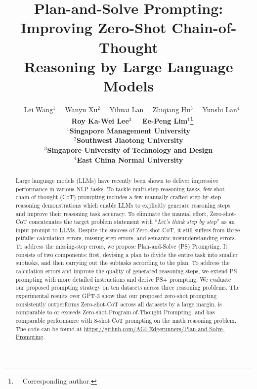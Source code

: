 \documentclass[11pt]{article}
\title{Plan-and-Solve Prompting: Improving Zero-Shot Chain-of-Thought \\ Reasoning by Large Language Models
}
\author{
    ~~Lei Wang$^{1}$
   ~~Wanyu Xu$^{2}$
   ~~Yihuai Lan 
   ~~Zhiqiang Hu$^{3}$ 
   ~~Yunshi Lan$^{4}$ \\ \bf
   ~~Roy Ka-Wei Lee$^{3}$
   ~~Ee-Peng Lim$^{1}$\thanks{~~Corresponding author.}\\ 
   $^{1}$Singapore Management University \\
   $^{2}$Southwest Jiaotong University \\
   $^{3}$Singapore University of Technology and Design\\
   $^{4}$East China Normal University\\
}
\begin{document}
\maketitle


\begin{abstract}
Large language models (LLMs) have recently been shown to deliver impressive performance in various NLP tasks. 
To tackle multi-step reasoning tasks, few-shot chain-of-thought (CoT) prompting 
includes a few manually crafted step-by-step reasoning demonstrations which 
enable LLMs to explicitly generate reasoning steps and improve their reasoning task accuracy. 
To eliminate the manual effort, Zero-shot-CoT concatenates the target problem statement with ``\textit{Let's think step by step}'' as an input prompt to LLMs.
Despite the success of Zero-shot-CoT, it still suffers from three pitfalls: calculation errors,  missing-step errors, and semantic misunderstanding errors.
To address the missing-step errors, we propose Plan-and-Solve (PS) Prompting.
It consists of two components: first, devising a plan to divide the entire task into smaller subtasks, and then carrying out the subtasks according to the plan.
To address the calculation errors and improve the quality of generated reasoning steps, we extend PS prompting with more detailed instructions and derive PS+ prompting.
We evaluate our proposed prompting strategy on ten datasets across three reasoning problems.
The experimental results over GPT-3 show that our proposed zero-shot prompting consistently outperforms Zero-shot-CoT across all datasets by a large margin, is comparable to or exceeds Zero-shot-Program-of-Thought Prompting, and has comparable performance with 8-shot CoT prompting on the math reasoning problem. The code can be found at \href{https://github.com/AGI-Edgerunners/Plan-and-Solve-Prompting}{https://github.com/AGI-Edgerunners/Plan-and-Solve-Prompting}.

\end{abstract}
\end{document}
